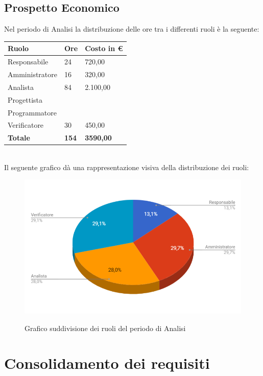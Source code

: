 \documentclass[PianoDiProgetto.tex]{subfiles}
\begin{document}
\subsection{Prospetto Economico}
Nel periodo di Analisi la distribuzione delle ore tra i differenti ruoli è la seguente:\\
\begin{table}[htbp]
	\centering
	\renewcommand\arraystretch{1.5}
	\begin{tabularx}{\textwidth}{p{5cm}|p{4cm}|p{4cm}}
		\hline
		\textbf{Ruolo} & \textbf{Ore} & \textbf{Costo in \euro} \\
		\hline
		Responsabile & 24 & 720,00 \\
		\hline
		Amministratore & 16 & 320,00 \\
		\hline
		Analista & 84 & 2.100,00 \\
		\hline
		Progettista & \ & \ \\
		\hline
		Programmatore & \ & \ \\
		\hline
		Verificatore & 30 & 450,00 \\
		\hline
		\textbf{Totale} & \textbf{154} & \textbf{3590,00}\\
		\hline
	\end{tabularx}
\end{table} \\
Il seguente grafico dà una rappresentazione visiva della distribuzione dei ruoli:
\begin{figure}
	\includegraphics[width=14.5cm]{images/prospettoEconomico/analisi.png}
	\label{fig:foo}
	\caption{Grafico suddivisione dei ruoli del periodo di Analisi}
\end{figure} 
\newpage
\section{Consolidamento dei requisiti}
\end{document}
